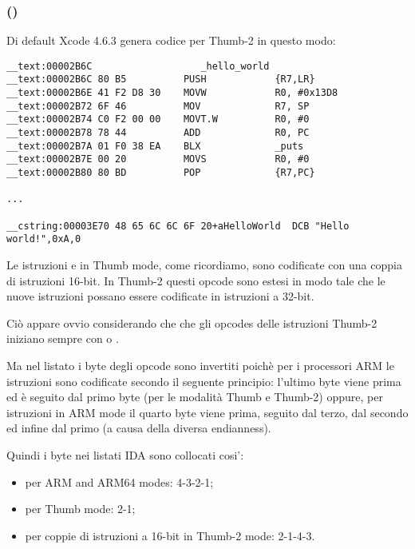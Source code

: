 \subsubsection{\OptimizingXcodeIV (\ThumbTwoMode)}

Di default Xcode 4.6.3 genera codice per Thumb-2 in questo modo:

\begin{lstlisting}[caption=\OptimizingXcodeIV (\ThumbTwoMode),style=customasmARM]
__text:00002B6C                   _hello_world
__text:00002B6C 80 B5          PUSH            {R7,LR}
__text:00002B6E 41 F2 D8 30    MOVW            R0, #0x13D8
__text:00002B72 6F 46          MOV             R7, SP
__text:00002B74 C0 F2 00 00    MOVT.W          R0, #0
__text:00002B78 78 44          ADD             R0, PC
__text:00002B7A 01 F0 38 EA    BLX             _puts
__text:00002B7E 00 20          MOVS            R0, #0
__text:00002B80 80 BD          POP             {R7,PC}

...

__cstring:00003E70 48 65 6C 6C 6F 20+aHelloWorld  DCB "Hello world!",0xA,0
\end{lstlisting}


\myindex{\ThumbTwoMode}

Le istruzioni  e  in Thumb mode, come ricordiamo, sono codificate con una coppia di istruzioni 16-bit.
In Thumb-2 questi opcode  sono estesi in modo tale che le nuove istruzioni possano essere codificate in istruzioni a 32-bit.

Ciò appare ovvio considerando che che gli opcodes delle istruzioni Thumb-2 iniziano sempre con  o .

Ma nel listato \IDA
i byte degli opcode sono invertiti poichè per i processori ARM le istruzioni sono codificate secondo il seguente principio:
l'ultimo byte viene prima ed è seguito dal primo byte (per le modalità Thumb e Thumb-2)
oppure, per istruzioni in ARM mode il quarto byte viene prima, seguito dal terzo, dal secondo ed infine dal primo (a causa
della diversa \gls{endianness}).

Quindi i byte nei listati IDA sono collocati cosi':
\begin{itemize}
\item per ARM and ARM64 modes: 4-3-2-1;
\item per Thumb mode: 2-1;
\item per coppie di istruzioni a 16-bit in Thumb-2 mode: 2-1-4-3.
\end{itemize}

